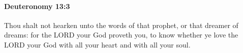 
		\paragraph{Deuteronomy 13:3} %
			\label{DEUTERONOMY-13-3}

			Thou shalt not hearken unto the words of that prophet, or that dreamer of dreams: for the LORD your God proveth you, to know whether ye love the LORD your God with all your heart and with all your soul.


